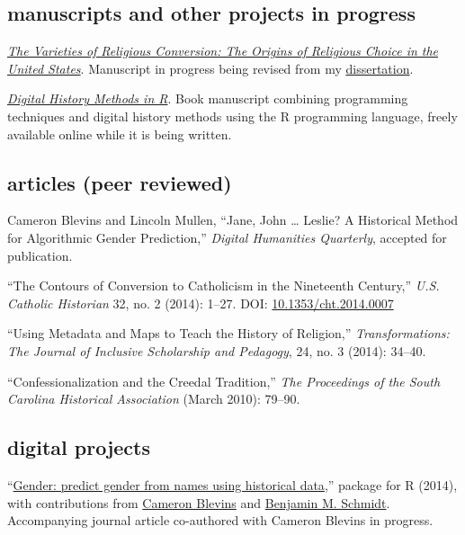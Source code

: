 \documentclass[11pt]{article}
\begin{document}
\subsection{manuscripts and other projects in
progress}\label{manuscripts-and-other-projects-in-progress}

\emph{\href{/research/\#varieties}{The Varieties of Religious
Conversion: The Origins of Religious Choice in the United States}}.
Manuscript in progress being revised from my
\href{/research/\#dissertation}{dissertation}.

\emph{\href{http://dh-r.lincolnmullen.com/}{Digital History Methods in
R}}. Book manuscript combining programming techniques and digital
history methods using the R programming language, freely available
online while it is being written.

\subsection{articles (peer reviewed)}\label{articles-peer-reviewed}

Cameron Blevins and Lincoln Mullen, ``Jane, John \ldots{} Leslie? A
Historical Method for Algorithmic Gender Prediction,'' \emph{Digital
Humanities Quarterly}, accepted for publication.

``The Contours of Conversion to Catholicism in the Nineteenth Century,''
\emph{U.S. Catholic Historian} 32, no. 2 (2014): 1--27. DOI:
\href{http://dx.doi.org/10.1353/cht.2014.0007}{10.1353/cht.2014.0007}

``Using Metadata and Maps to Teach the History of Religion,''
\emph{Transformations: The Journal of Inclusive Scholarship and
Pedagogy}, 24, no. 3 (2014): 34--40.

``Confessionalization and the Creedal Tradition,'' \emph{The Proceedings
of the South Carolina Historical Association} (March 2010): 79--90.

\subsection{digital projects}\label{digital-projects}

``\href{https://github.com/ropensci/gender}{Gender: predict gender from
names using historical data},'' package for R (2014), with contributions
from \href{http://cameronblevins.org}{Cameron Blevins} and
\href{http://benschmidt.org/}{Benjamin M. Schmidt}. Accompanying journal
article co-authored with Cameron Blevins in progress.
\end{document}

